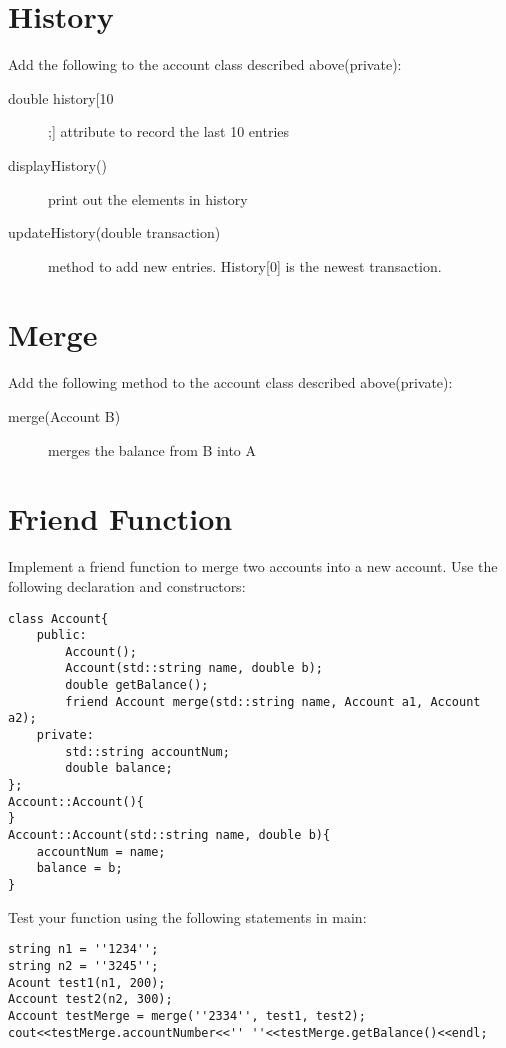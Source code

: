 \documentclass{article}
\begin{document}
\section*{History}
Add the following to the account class described above(private):
\begin{description}
    \item[double history[10];] attribute to record the last 10 entries
    \item[displayHistory()] print out the elements in history
    \item[updateHistory(double transaction)] method to add new
    entries. History[0] is the newest transaction.
\end{description}
 
\section*{Merge}
Add the following method to the account class described above(private):
\begin{description}
    \item[merge(Account B)] merges the balance from B into A
\end{description}

\section*{Friend Function}
Implement a friend function to merge two accounts into a new account.
Use the following declaration and constructors:
\begin{lstlisting}
class Account{
    public:
        Account();
        Account(std::string name, double b);
        double getBalance();
        friend Account merge(std::string name, Account a1, Account a2);
    private:
        std::string accountNum;
        double balance;
};
Account::Account(){
}
Account::Account(std::string name, double b){
    accountNum = name;
    balance = b;
}
\end{lstlisting}
Test your function using the following statements in main:
\begin{lstlisting}
string n1 = ''1234'';
string n2 = ''3245'';
Acount test1(n1, 200);
Account test2(n2, 300);
Account testMerge = merge(''2334'', test1, test2);
cout<<testMerge.accountNumber<<'' ''<<testMerge.getBalance()<<endl;
\end{lstlisting}
\end{document}
